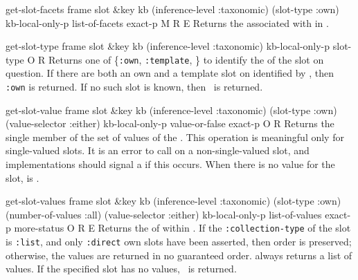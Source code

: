 \begin{okbcop}{get-slot-facets}{ frame slot \&key kb (inference-level :taxonomic) (slot-type :own) kb-local-only-p} { list-of-facets exact-p } { M } { R } { E }
Returns the  associated with  in
   .
\end{okbcop}

\begin{okbcop}{get-slot-type}{ frame slot \&key kb (inference-level :taxonomic) kb-local-only-p} { slot-type } { O } { R } {  }
Returns one of \{{\tt :own}, {\tt :template}, \false\} to
   identify the  of the slot on question.  If there are both
   an own and a template slot on  identified by , then
   {\tt :own} is returned.
   If no such slot is known, then \false\ is returned.
\end{okbcop}

\begin{okbcop}{get-slot-value}{ frame slot \&key kb (inference-level :taxonomic) (slot-type :own) (value-selector :either) kb-local-only-p} { value-or-false exact-p } { O } { R } {  }
Returns the single member of the set of values
   of the .  This operation is meaningful only for single-valued
   slots.  It is an error to call  on a non-single-valued 
   slot, and implementations should signal a  if 
   this occurs.  When there is no value for the slot,  
   is \false.
\end{okbcop}

\begin{okbcop}{get-slot-values}{ frame slot \&key kb (inference-level :taxonomic) (slot-type :own) (number-of-values :all) (value-selector :either) kb-local-only-p} { list-of-values exact-p more-status } { O } { R } { E }
Returns the  of 
   within .  If the {\tt :collection-type} of the slot is
   {\tt :list}, and only {\tt :direct} own slots have been asserted, then
   order is preserved; otherwise, the values are returned in no guaranteed
   order.   always returns a list of
   values.  If the specified slot has no values, \emptylist\ is 
   returned.
\end{okbcop}

